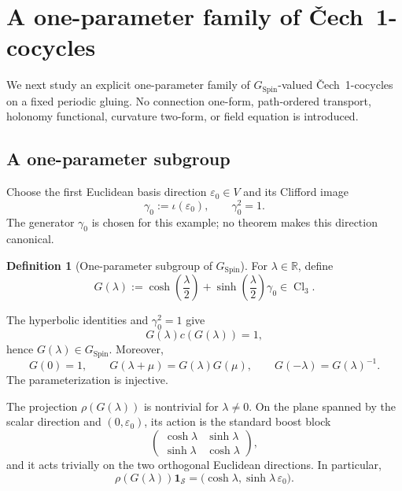 \documentclass[11pt,a4paper]{article}
\theoremstyle{definition}
\newtheorem{definition}[theorem]{Definition}
\theoremstyle{remark}
\newcommand{\R}{\mathbb{R}}
\newcommand{\Smodel}{\mathcal{S}}
\newcommand{\Cl}{\operatorname{Cl}}
\newcommand{\SpinG}{G_{\mathrm{Spin}}}
\newcommand{\Cech}{\ifmmode\text{\v{C}ech}\else\v{C}ech\fi}
\begin{document}
\clearpage
\section{A one-parameter family of \Cech\ 1-cocycles}
\label{sec:deformation}

We next study an explicit one-parameter family of \(\SpinG\)-valued \Cech\ 1-cocycles on a fixed periodic gluing.  No connection one-form, path-ordered
transport, holonomy functional, curvature two-form, or field equation is
introduced.

\subsection{A one-parameter subgroup}

Choose the first Euclidean basis direction \(\varepsilon_{0}\in V\)
and its Clifford image
\[
    \gamma_{0}:=\iota(\varepsilon_{0}),
    \qquad \gamma_{0}^{2}=1.
\]
The generator \(\gamma_{0}\) is chosen for this example; no theorem makes
this direction canonical.

\begin{definition}[One-parameter subgroup of \(\SpinG\)]
\label{def:G-lambda}
For \(\lambda\in\R\), define
\[
   G(\lambda)
   :=
   \cosh\!\left(\frac{\lambda}{2}\right)
   +
   \sinh\!\left(\frac{\lambda}{2}\right)\gamma_{0}
   \in\Cl_{3}.
\tag{11.1}\label{eq:selected-spin-path}
\]
\end{definition}

The hyperbolic identities and \(\gamma_{0}^{2}=1\) give
\[
   G(\lambda)c(G(\lambda))=1,
\]
hence \(G(\lambda)\in\SpinG\).  Moreover,
\[
   G(0)=1,\qquad
   G(\lambda+\mu)=G(\lambda)G(\mu),\qquad
   G(-\lambda)=G(\lambda)^{-1}.
\tag{11.2}
\]
The parameterization is injective.

The projection \(\rho(G(\lambda))\) is nontrivial for
\(\lambda\neq0\).  On the plane spanned by the scalar direction
and \((0,\varepsilon_{0})\), its action is the standard boost block
\[
   \begin{pmatrix}
      \cosh\lambda & \sinh\lambda\\
      \sinh\lambda & \cosh\lambda
   \end{pmatrix},
\tag{11.3}\label{eq:boost-block}
\]
and it acts trivially on the two orthogonal Euclidean directions.
In particular,
\[
   \rho(G(\lambda))\mathbf1_{\Smodel}
   =
   \bigl(\cosh\lambda,\sinh\lambda\,\varepsilon_{0}\bigr).
\tag{11.4}
\]
\end{document}
